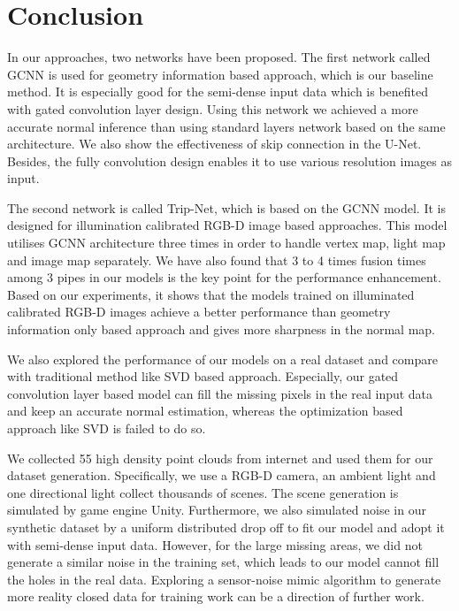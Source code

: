 
\chapter{Conclusion} %

\label{ch:06} %

In our approaches, two networks have been proposed. The first network called GCNN is used for geometry information based approach, which is our baseline method. It is especially good for the semi-dense input data which is benefited with gated convolution layer design.  Using this network we achieved a more accurate normal inference than using standard layers network based on the same architecture. We also show the effectiveness of skip connection in the U-Net. Besides, the fully convolution design enables it to use various resolution images as input. 

The second network is called Trip-Net, which is based on the GCNN model. It is designed for illumination calibrated RGB-D image based approaches. This model utilises GCNN architecture three times in order to handle vertex map, light map and image map separately. We have also found that 3 to 4 times fusion times among 3 pipes in our models is the key point for the performance enhancement.
Based on our experiments, it shows that the models trained on illuminated calibrated RGB-D images achieve a  better performance than geometry information only based approach and gives more sharpness in the normal map.

We also explored the performance of our models on a real dataset and compare with traditional method like SVD based approach. Especially, our gated convolution layer based model can fill the missing pixels in the real input data and keep an accurate normal estimation, whereas the optimization based approach like SVD is failed to do so. 


We collected 55 high density point clouds from internet and used them for our dataset generation. Specifically, we use a RGB-D camera, an ambient light and one directional light  collect thousands of scenes. The scene generation is simulated by game engine Unity. Furthermore, we also simulated noise in our synthetic dataset by a uniform distributed drop off to fit our model and adopt it with semi-dense input data.
However, for the large missing areas, we did not generate a similar noise in the training set, which leads to our model cannot fill the holes in the real data. Exploring a sensor-noise mimic algorithm to generate more reality closed data for training work can be a direction of further work.